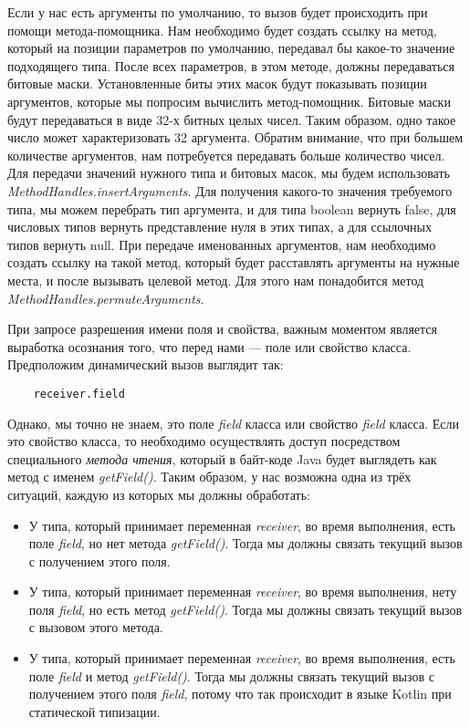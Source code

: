 Если у нас есть аргументы по умолчанию, то вызов будет происходить при помощи метода-помощника. Нам необходимо будет создать ссылку на метод, который на позиции параметров по умолчанию, передавал бы какое-то значение подходящего типа. После всех параметров, в этом методе, должны передаваться битовые маски. Установленные биты этих масок будут показывать позиции
аргументов, которые мы попросим вычислить метод-помощник. Битовые маски будут передаваться в виде 32-х битных целых чисел. Таким образом, одно такое число может характеризовать 32 аргумента. Обратим внимание, что при большем количестве аргументов, нам потребуется передавать больше количество чисел. Для передачи значений нужного типа и битовых масок, мы будем использовать \textit{MethodHandles.insertArguments}. Для получения какого-то значения требуемого типа, мы можем перебрать тип аргумента, и для типа boolean вернуть false, для числовых типов вернуть представление нуля в этих типах, а для ссылочных типов вернуть null.
При передаче именованных аргументов, нам необходимо создать ссылку на такой метод, который будет расставлять аргументы на нужные места, и после вызывать целевой метод. Для этого нам понадобится метод \textit{MethodHandles.permuteArguments}.

При запросе разрешения имени поля и свойства, важным моментом является выработка осознания того, что перед нами --- поле или свойство класса. Предположим динамический вызов выглядит так:

\begin{verbatim}
    receiver.field
\end{verbatim}

Однако, мы точно не знаем, это поле \textit{field} класса или свойство \textit{field} класса. Если это свойство класса, то необходимо осуществлять доступ посредством специального \textit{метода чтения}, который в байт-коде Java будет выглядеть как метод с именем \textit{getField()}. Таким образом, у нас возможна одна из трёх ситуаций, каждую из которых мы должны обработать:

\begin{itemize}
    \item У типа, который принимает переменная \textit{receiver}, во время выполнения, есть поле \textit{field}, но нет метода \textit{getField()}. Тогда мы должны связать текущий вызов с получением этого поля.
    \item У типа, который принимает переменная \textit{receiver}, во время выполнения, нету поля \textit{field}, но есть метод \textit{getField()}. Тогда мы должны связать текущий вызов с вызовом этого метода.
    \item У типа, который принимает переменная \textit{receiver}, во время выполнения, есть поле \textit{field} и метод \textit{getField()}. Тогда мы должны связать текущий вызов с получением этого поля \textit{field}, потому что так происходит в языке Kotlin при статической типизации.
\end{itemize}






